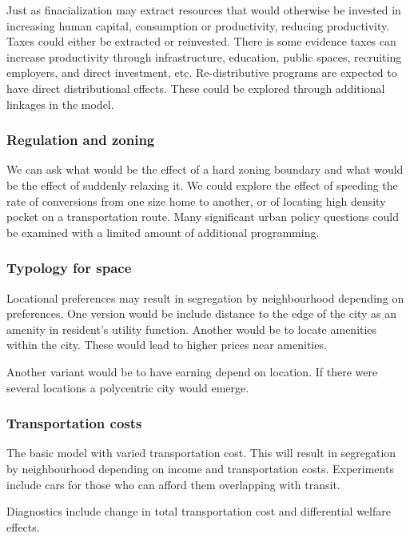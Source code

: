 Just as finacialization may extract resources that would otherwise be invested in increasing human capital, consumption or productivity, reducing productivity. Taxes could either be extracted or reinvested. There is some evidence taxes can increase productivity through infrastructure, education, public spaces, recruiting employers, and direct investment, etc. Re-distributive programs are expected to have direct distributional effects. These could be explored through additional linkages in the model.


\subsubsection{Regulation and zoning}
We can ask what would be the effect of a hard zoning boundary and what would be the effect of suddenly relaxing it. We could explore the effect of speeding the rate of conversions from one size  home to another, or of locating high density pocket on a transportation route. Many significant urban policy questions could be examined with a limited amount of additional programming. 

\subsubsection{Typology for space}
Locational preferences may result in segregation by neighbourhood depending on preferences. One version would be include distance to the edge of the city as an amenity in resident's utility function. Another would be to locate amenities within the city. These would lead to higher prices near amenities.

Another variant would be to have earning depend on location. If there were several locations a polycentric city would emerge.






\subsubsection{Transportation costs} %

The basic model with varied transportation cost. This will result in segregation by neighbourhood depending on income and transportation costs. Experiments include cars for those who can afford them overlapping with transit. 

Diagnostics include change in total transportation cost and differential welfare effects.

